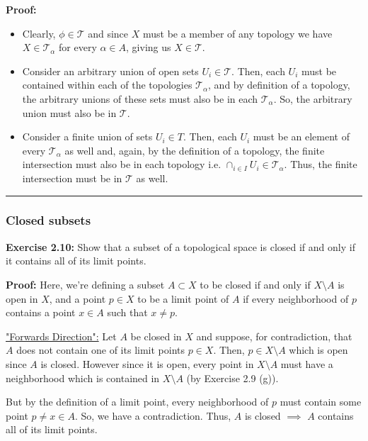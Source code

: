 \documentclass{article}
\newcommand*{\T}{\mathcal T}
\begin{document}
\textbf{Proof:}
\begin{itemize}
  \item Clearly, $\phi \in \mathcal T$ and since $X$ must be a member of any topology we have $X \in \T_{\alpha}$ for every $\alpha \in A$, giving us $X \in \T$.
  
  \item Consider an arbitrary union of open sets $U_i \in \T$. Then, each $U_i$ must be contained within each of the topologies $\T_{\alpha}$, and by definition of a topology, the arbitrary unions of these sets must also be in each $\T_{\alpha}$. So, the arbitrary union must also be in $\T$.
  
  \item Consider a finite union of sets $U_i \in T$. Then, each $U_i$ must be an element of every $\T_{\alpha}$ as well and, again, by the definition of a topology, the finite intersection must also be in each topology i.e. $\cap_{i \in I} U_i \in \T_{\alpha}$. Thus, the finite intersection must be in $\T$ as well. 
\end{itemize}

\vskip 0.5cm
\hrule
\vskip 0.5cm

\subsubsection{Closed subsets}

\textbf{Exercise 2.10:}  Show that a subset of a topological space is closed if and only if it contains all of its limit points.

\vskip 0.5cm

\textbf{Proof:}
Here, we're defining a subset $A \subset X$ to be closed if and only if $X \setminus A$ is open in $X$, and a point $p \in X$ to be a limit point of $A$ if every neighborhood of $p$ contains a point $x \in A$ such that $x \neq p$.

\vskip 0.5cm

\underline{"Forwards Direction":} Let $A$ be closed in $X$ and suppose, for contradiction, that $A$ does not contain one of its limit points $p \in X$. Then, $p \in X \setminus A$ which is open since $A$ is closed. However since it is open, every point in $X \setminus A$ must have a neighborhood which is contained in $X \setminus A$ (by Exercise 2.9 (g)). 

\vskip 0.25cm

But by the definition of a limit point, every neighborhood of $p$ must contain some point $p \neq x \in A$. So, we have a contradiction. Thus, $A$ is closed $\implies$ $A$ contains all of its limit points.
\end{document}
